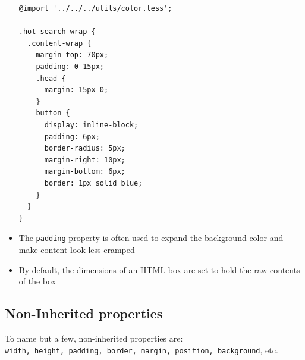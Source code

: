 \documentclass[a4paper, 12pt]{article}
\begin{document}
\begin{itemize}
\begin{verbatim}
@import '../../../utils/color.less';

.hot-search-wrap {
  .content-wrap {
    margin-top: 70px;
    padding: 0 15px;
    .head {
      margin: 15px 0;
    }
    button {
      display: inline-block;
      padding: 6px;
      border-radius: 5px;
      margin-right: 10px;
      margin-bottom: 6px;
      border: 1px solid blue;
    }
  }
}
\end{verbatim}

\item The \verb|padding| property is often used to expand the background color and make content look less cramped

\item By default, the dimensions of an HTML box are set to hold the raw contents of the box

\end{itemize}


\subsection{Non-Inherited properties}
To name but a few, non-inherited properties are:\\ \verb|width, height, padding, border, margin, position, background|, etc.
\end{document}
